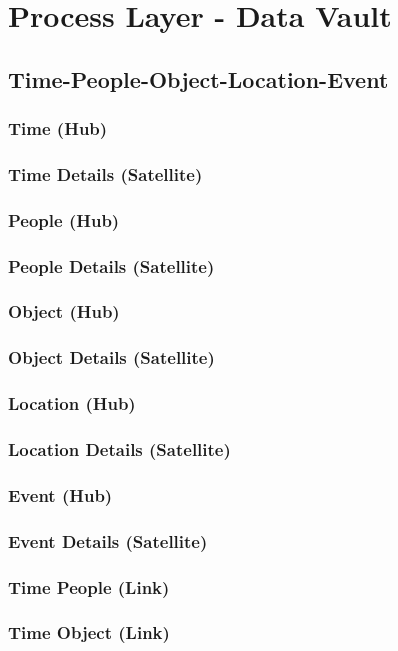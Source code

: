 \documentclass{acm_proc_article-sp}
\begin{document}
\section{Process Layer - Data Vault}
\subsection{Time-People-Object-Location-Event}
\subsubsection{Time (Hub)}
\subsubsection{Time Details (Satellite)}
\subsubsection{People (Hub)}
\subsubsection{People Details (Satellite)}
\subsubsection{Object (Hub)}
\subsubsection{Object Details (Satellite)}
\subsubsection{Location (Hub)}
\subsubsection{Location Details (Satellite)}
\subsubsection{Event (Hub)}
\subsubsection{Event Details (Satellite)}
\subsubsection{Time People (Link)}
\subsubsection{Time Object (Link)}
\end{document}
